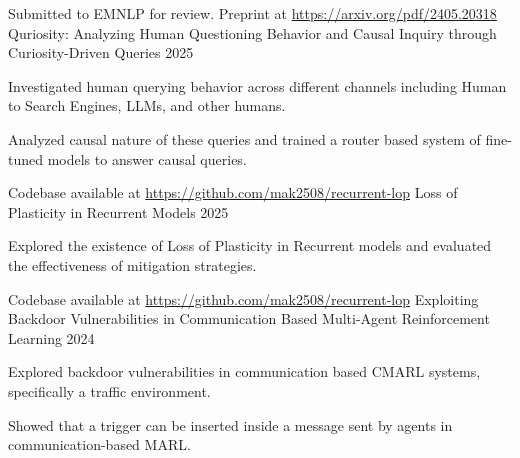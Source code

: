 

\begin{cventries}

  \cventry
    {Submitted to EMNLP for review. Preprint at \url{https://arxiv.org/pdf/2405.20318}} %
    {Quriosity: Analyzing Human Questioning Behavior
and Causal Inquiry through Curiosity-Driven Queries} %
    {} %
    {2025} %
    {
      \begin{cvitems} %
        \item {Investigated human querying behavior across different channels including Human to Search Engines, LLMs, and other
        humans.}
        \item {Analyzed causal nature of these queries and trained a router based system of fine-tuned models to answer causal queries.}
      \end{cvitems}
    }

  \cventry
    {Codebase available at \url{https://github.com/mak2508/recurrent-lop}} %
    {Loss of Plasticity in Recurrent Models} %
    {} %
    {2025} %
    {
      \begin{cvitems} %
        \item {Explored the existence of Loss of Plasticity in Recurrent models and evaluated the effectiveness of mitigation strategies.}
      \end{cvitems}
    }

\cventry
{Codebase available at \url{https://github.com/mak2508/recurrent-lop}} %
{Exploiting Backdoor Vulnerabilities in Communication Based Multi-Agent Reinforcement Learning} %
{} %
{2024} %
{
  \begin{cvitems} %
    \item {Explored backdoor vulnerabilities in communication based CMARL systems, specifically a traffic environment.}
    \item {Showed that a trigger can be inserted inside a message sent by agents in communication-based MARL.}
  \end{cvitems}
}


\end{cventries}
